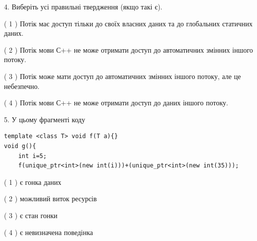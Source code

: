 \documentclass[12pt, ukrainian]{article}
\begin{document}
\begin {large}
{%
4. Виберіть усі правильні твердження (якщо такі є).\par
\vspace{2mm}

( 1 ) Потік має доступ тільки до своїх власних даних та до глобальних статичних даних.%

( 2 ) Потік мови С++ не може отримати доступ до автоматичних змінних іншого потоку.%

( 3 ) Потік може мати доступ до автоматичних змінних іншого потоку, але це небезпечно.%

( 4 ) Потік мови С++ не може отримати доступ до даних іншого потоку.%


5. У цьому фрагменті коду
\begin{verbatim}
template <class T> void f(T a){}
void g(){
    int i=5;
    f(unique_ptr<int>(new int(i)))+(unique_ptr<int>(new int(35)));
\end{verbatim}
( 1 ) є гонка даних%

( 2 ) можливий виток ресурсів%

( 3 ) є стан гонки%

( 4 ) є невизначена поведінка%
}
\end {large}
\end{document}
